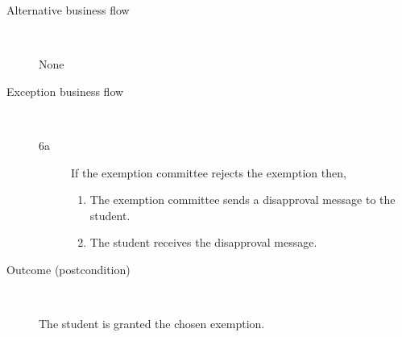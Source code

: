 \begin{description}
\begin{enumerate}
	\end{enumerate}
	\item[Alternative business flow] \ 
		\par None
	\item[Exception business flow] \ 
	\begin{description}
		\item[6a]  If the exemption committee rejects the exemption then,
		\begin{enumerate}
		  \item The exemption committee sends a disapproval message to the student.
		  \item The student receives the disapproval message.
		\end{enumerate}
	\end{description}
	\item[Outcome (postcondition)] \ 
		\par The student is granted the chosen exemption.
\end{description}
